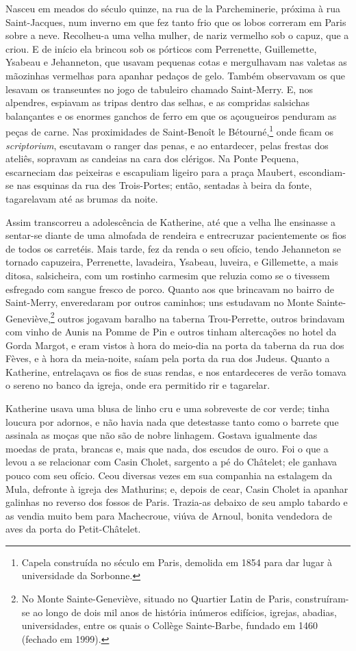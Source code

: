 Nasceu em meados do século quinze, na rua de la Parcheminerie, próxima à
rua Saint-Jacques, num inverno em que fez tanto frio que os lobos correram
em Paris sobre a neve. Recolheu-a uma velha mulher, de nariz vermelho sob
o capuz, que a criou. E de início ela brincou sob os pórticos com
Perrenette, Guillemette, Ysabeau e Jehanneton, que usavam pequenas cotas e
mergulhavam nas valetas as mãozinhas vermelhas para apanhar pedaços de
gelo. Também observavam os que lesavam os transeuntes no jogo de tabuleiro
chamado Saint-Merry. E, nos alpendres, espiavam as tripas dentro das
selhas, e as compridas salsichas balançantes e os enormes ganchos de ferro
em que os açougueiros penduram as peças de carne. Nas proximidades de
Saint-Benoît le Bétourné,\footnote{ Capela construída no século  em
Paris, demolida em 1854 para dar lugar à universidade da Sorbonne.} 
onde ficam os \textit{scriptorium}, escutavam o ranger das penas, e
ao entardecer, pelas frestas dos ateliês, sopravam as candeias na cara dos
clérigos. Na Ponte Pequena, escarneciam das peixeiras e escapuliam ligeiro
para a praça Maubert, escondiam-se nas esquinas da rua des Trois-Portes;
então, sentadas à beira da fonte, tagarelavam até as brumas da noite.

Assim transcorreu a adolescência de Katherine, até que a velha lhe
ensinasse a sentar-se diante de uma almofada de rendeira e entrecruzar
pacientemente os fios de todos os carretéis. Mais tarde, fez da renda o
seu ofício, tendo Jehanneton se tornado capuzeira, Perrenette, lavadeira,
Ysabeau, luveira, e Gillemette, a mais ditosa, salsicheira, com um
rostinho carmesim que reluzia como se o tivessem esfregado com sangue
fresco de porco. Quanto aos que brincavam no bairro de Saint-Merry,
enveredaram por outros caminhos; uns estudavam no Monte
Sainte-Geneviève,\footnote{ No Monte Sainte-Geneviève, situado no Quartier
Latin de Paris, construíram-se ao longo de dois mil anos de história
inúmeros edifícios, igrejas, abadias, universidades, entre os quais o
Collège Sainte-Barbe, fundado em 1460 (fechado em 1999).} outros
jogavam baralho na taberna Trou-Perrette, outros brindavam com vinho de
Aunis na Pomme de Pin e outros tinham altercações no hotel da Gorda
Margot, e eram vistos à hora do meio-dia na porta da taberna da rua dos
Fèves, e à hora da meia-noite, saíam pela porta da rua dos Judeus. Quanto
a Katherine, entrelaçava os fios de suas rendas, e nos entardeceres de
verão tomava o sereno no banco da igreja, onde era permitido rir e
tagarelar.

Katherine usava uma blusa de linho cru e uma sobreveste de cor verde; tinha
loucura por adornos, e não havia nada que detestasse tanto como o barrete
que assinala as moças que não são de nobre linhagem. Gostava igualmente
das moedas de prata, brancas e, mais que nada, dos escudos de ouro. Foi o
que a levou a se relacionar com Casin Cholet, sargento a pé do Châtelet;
ele ganhava pouco com seu ofício. Ceou diversas vezes em sua companhia na
estalagem da Mula, defronte à igreja des Mathurins; e, depois de cear,
Casin Cholet ia apanhar galinhas no reverso dos fossos de Paris. Trazia-as
debaixo de seu amplo tabardo e as vendia muito bem para Machecroue, viúva
de Arnoul, bonita vendedora de aves da porta do Petit-Châtelet.


